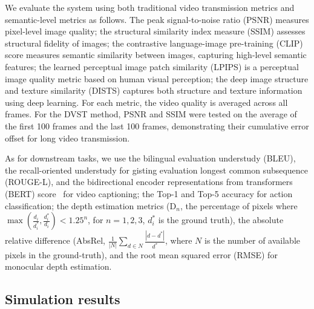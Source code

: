 \documentclass[10pt,journal]{IEEEtran}
\begin{document}
We evaluate the system using both traditional video transmission metrics and semantic-level metrics as follows.
The peak signal-to-noise ratio (PSNR) measures pixel-level image quality;
the structural similarity index measure (SSIM) assesses structural fidelity of images;
the contrastive language-image pre-training (CLIP) score measures semantic similarity between images, capturing high-level semantic features;
the learned perceptual image patch similarity (LPIPS) is a perceptual image quality metric based on human visual perception;
the deep image structure and texture similarity (DISTS) captures both structure and texture information using deep learning.
For each metric, the video quality is averaged across all frames. For the DVST method, PSNR and SSIM were tested on the average of the first 100 frames and the last 100 frames, demonstrating their cumulative error offset for long video transmission.

As for downstream tasks, we use the bilingual evaluation understudy (BLEU), the recall-oriented understudy for gisting evaluation longest common subsequence (ROUGE-L), and the bidirectional encoder representations from transformers (BERT) score~\cite{zhangbertscore} for video captioning; the Top-1 and Top-5 accuracy for action classification; the depth estimation metrics ($\text{D}_n$, the percentage of pixels where $\max\!\left( \frac{d_i}{d_i^*}, \frac{d_i^*}{d_i} \right) < 1.25^n$, for $n = 1, 2, 3$, $d_i^*$ is the ground truth), the absolute relative difference (AbsRel, $\frac{1}{|N|} \sum_{d \in N} \frac{|d - d^*|}{d^*}$, where $N$ is the number of available pixels in the ground-truth), and the root mean squared error (RMSE) for monocular depth estimation.
\subsection{Simulation results}
\end{document}

